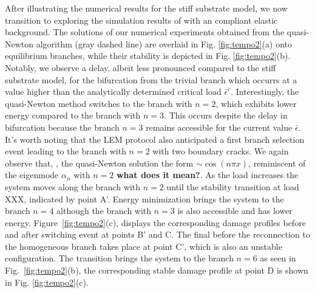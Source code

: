 After illustrating the numerical results for the stiff substrate model, we now transition to exploring the simulation results of with an compliant elastic background. The solutions of our numerical experiments obtained from the quasi-Newton algorithm (gray dashed line) are overlaid in Fig. \ref{fig:tempo2}(a) onto equilibrium branches, while their stability is depicted in Fig. \ref{fig:tempo2}(b). Notably, we observe a delay, albeit less pronounced compared to the stiff substrate model, for the bifurcation from the trivial branch which occurrs at a value  higher than the analytically determined critical load \(\bar{\epsilon}^c\). Interestingly, the quasi-Newton method switches to the branch with $n=2$, which exhibits lower energy compared to the branch with $n=3$. This occurs  despite the delay in bifurcation because the branch  $n=3$ remains accessible for the current value $\bar\epsilon$. It's worth noting that the LEM protocol also anticipated a first branch selection event leading to the branch with $n=2$ with two boundary cracks. 
We again observe that, , the quasi-Newton solution  the form \(\sim \cos(n\pi x)\), reminiscent of the eigenmode $\alpha_n$  with \(n=2\) \textbf{what does it mean?}. 
As the load increases the system moves along the branch with $n=2$ until the stability transition at load XXX, indicated by point A'. Energy minimization brings the system to the branch $n=4$ although the branch with $n=3$ is also accessible and has lower energy. Figure~\ref{fig:tempo2}(c), displays the corresponding damage profiles before and after  switching event  at points B' and C. The final  before the reconnection to the homogeneous branch takes place at point C', which is also an unstable configuration. The transition brings the system to the branch $n=6$ as seen in Fig.~\ref{fig:tempo2}(b), the corresponding stable damage profile at point D is shown in Fig. \ref{fig:tempo2}(c). 

